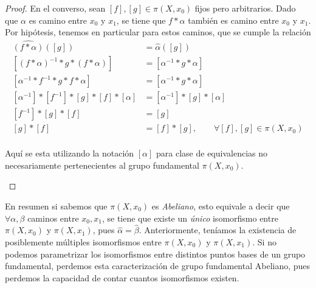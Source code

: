 {\begin{proof}
  En el converso, sean \([f],[g] \in \pi (X, x_0) \) fijos pero
  arbitrarios. Dado que \(\alpha\) es camino entre \(x_0\) y \(x_1\), se
  tiene que \(f * \alpha\) también es camino entre \(x_0\) y \(x_1\).
  Por hipótesis, tenemos en particular para estos caminos, que se cumple
  la relación
  \begin{align*}
    \widehat{\left( f * \alpha \right)} ([g]) &= \hat{\alpha} ([g]) \\
    [(f * \alpha)^{-1} * g * (f * \alpha) ] &= [\alpha^{-1} * g * \alpha] \\
    [\alpha^{-1} * f^{-1} * g * f * \alpha ] &= [\alpha^{-1} * g * \alpha] \\
    [\alpha^{-1}] * [f^{-1}] * [g] * [f] * [\alpha] &= [\alpha^{-1}] *
        [g] * [\alpha] \\
    [f^{-1}] * [g] * [f] &= [g] \\
    [g] * [f] &= [f] * [g], \qquad \forall [f],[g] \in \pi (X, x_0) \\
  \end{align*}

  \begin{acotacion}
    Aquí se esta utilizando la notación \( [\alpha]\) para clase de
    equivalencias no necesariamente pertenecientes al grupo fundamental
    \(\pi (X, x_0)\).
  \end{acotacion}
\end{proof}

En resumen si sabemos que \(\pi (X, x_0)\) es \emph{Abeliano}, esto equivale a
decir que \(\forall \alpha,\beta\) caminos entre \(x_0, x_1\), se tiene
que existe un \emph{único} isomorfismo entre \(\pi (X,x_0) \) y \( \pi
(X,x_1)\), pues \(\hat \alpha = \hat \beta\). Anteriormente, teníamos la
existencia de posiblemente múltiples isomorfismos entre \(\pi (X, x_0)
\) y \(\pi (X, x_1) \). Si no podemos parametrizar los isomorfismos
entre distintos puntos bases de un grupo fundamental, perdemos esta
caracterización de grupo fundamental Abeliano, pues perdemos la capacidad
de contar cuantos isomorfismos existen.

}
